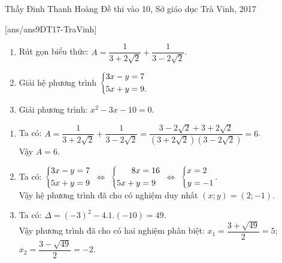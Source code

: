  
\begin{name}
{Thầy  Đinh Thanh Hoàng}
{Đề thi vào 10, Sở giáo dục Trà Vinh, 2017}
\end{name}
\setcounter{ex}{0}
[ans/ans9DT17-TraVinh]
\begin{ex}%
    \hfill
    \begin{enumerate}
        \item Rút gọn biểu thức: $A=\dfrac{1}{3+2\sqrt{2}}+\dfrac{1}{3-2\sqrt{2}}$.
        \item Giải hệ phương trình $\left\{\begin{aligned}3x-y&=7\\ 5x+y&=9.\end{aligned}\right.$
        \item Giải phương trình: $x^2-3x-10=0$.
    \end{enumerate}
\loigiai
    {
    \begin{enumerate}
        \item Ta có: $A=\dfrac{1}{3+2\sqrt{2}}+\dfrac{1}{3-2\sqrt{2}}=\dfrac{3-2\sqrt{2}+3+2\sqrt{2}}{\left( {3 + 2\sqrt 2 } \right)\left( {3 - 2\sqrt 2 } \right)}=6$.\\
        Vậy $A=6$.
        \item Ta có: $\left\{\begin{aligned}3x-y&=7\\ 5x+y&=9\end{aligned}\right.$ $\Leftrightarrow$ $\left\{\begin{aligned}8x&=16\\ 5x+y&=9\end{aligned}\right.$ $\Leftrightarrow$ $\left\{\begin{aligned}x&=2\\ y&=-1\end{aligned}\right.$.\\
        Vậy hệ phương trình đã cho có nghiệm duy nhất $(x; y)=(2; -1)$.
        \item Ta có: $\Delta=(-3)^2-4.1.(-10)=49$.\\
        Vậy phương trình đã cho có hai nghiệm phân biệt: $x_1=\dfrac{3+\sqrt{49}}{2}=5$; $x_2=\dfrac{3-\sqrt{49}}{2}=-2$.
    \end{enumerate}
    }
\end{ex}

